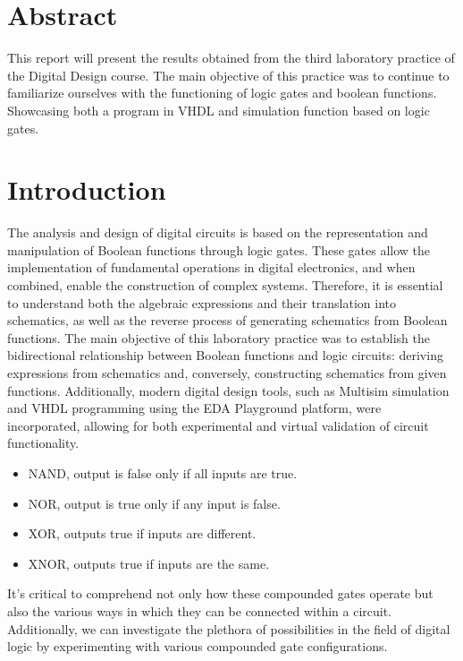 \documentclass[12pt]{article}  %
\begin{document}
\section{Abstract} %
This report will present the results obtained from the third laboratory practice of the Digital Design course. The main objective of this practice was to continue to familiarize ourselves with the
functioning of logic gates and boolean functions. Showcasing both a program in VHDL and simulation function based on logic gates.
\section{Introduction} %
The analysis and design of digital circuits is based on the representation and manipulation of Boolean functions through logic gates. These gates allow the implementation of fundamental operations in digital electronics, and when combined, enable the construction of complex systems. Therefore, it is essential to understand both the algebraic expressions and their translation into schematics, as well as the reverse process of generating schematics from Boolean functions.
The main objective of this laboratory practice was to establish the bidirectional relationship between Boolean functions and logic circuits: deriving expressions from schematics and, conversely, constructing schematics from given functions. Additionally, modern digital design tools, such as Multisim simulation and VHDL programming using the EDA Playground platform, were incorporated, allowing for both experimental and virtual validation of circuit functionality.
\begin{itemize}
  \item NAND, output is false only if all inputs are true.
  \item NOR, output is true only if any input is false.
  \item XOR, outputs true if inputs are different.
  \item XNOR, outputs true if inputs are the same.
\end{itemize}\cite{unacademy_logic_gates}
It's critical to comprehend not only how these compounded gates operate but also the various ways in which they can be connected within a circuit.  Additionally, we can investigate the plethora of possibilities in the field of digital logic by experimenting with various compounded gate configurations.
\end{document}
